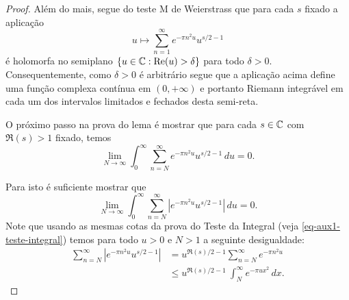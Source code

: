 \begin{proof}
        Além do mais, segue do teste M de Weierstrass que para cada $s$ fixado a aplicação 
        \[
        u\longmapsto \sum_{n=1}^{\infty} e^{-\pi n^2u} u^{s/2-1}  
        \]
        é holomorfa no semiplano $\{u\in \mathbb{C}: \mathrm{Re}(u)>\delta\}$ para 
        todo $\delta>0$. Consequentemente, como $\delta>0$ é arbitrário segue que a aplicação acima define uma função complexa contínua em $(0,+\infty)$ e portanto Riemann integrável em cada um dos intervalos limitados e fechados desta semi-reta.
        
        O próximo passo na prova do lema é mostrar que para cada $s\in \mathbb{C}$ com $\Re(s)>1$ fixado,
        temos
        \[
        \lim_{N\to\infty}
        \int_0^{\infty}\sum_{n=N}^{\infty} e^{-\pi n^2u}u^{s/2 - 1} \, du
        =
        0.
        \]
        
        Para isto é suficiente mostrar que 
        \[
        \lim_{N\to\infty}
        \int_0^{\infty}\sum_{n=N}^{\infty} |e^{-\pi n^2u}u^{s/2 - 1}| \, du
        =
        0.
        \]
        Note que usando as mesmas cotas da prova do Teste da Integral (veja \eqref{eq-aux1-teste-integral}) temos para todo $u>0$ e $N>1$ a seguinte desigualdade:
        \begin{align}
        \label{eq-aux1-lema-int-soma-theta}
            \sum_{n=N}^{\infty} 
            |e^{-\pi n^2u}u^{s/2 - 1}|
            &=
            u^{\Re(s)/2 - 1} 
            \sum_{n=N}^{\infty} e^{-\pi n^2u}
            \nonumber\\[0.3cm]
            &\leqslant
            u^{\Re(s)/2 - 1}\
            \int_{N}^{\infty} 
            e^{-\pi u x^2}\, dx.
        \end{align}
        

\end{proof}
